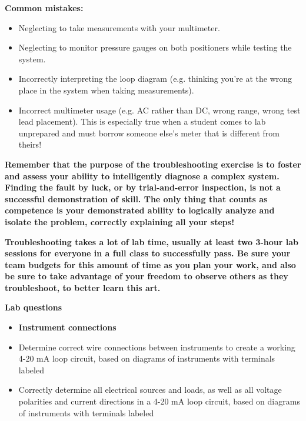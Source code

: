 \vskip 10pt

{\bf Common mistakes:}

\begin{itemize}
\item{} Neglecting to take measurements with your multimeter.
\item{} Neglecting to monitor pressure gauges on both positioners while testing the system.
\item{} Incorrectly interpreting the loop diagram (e.g. thinking you're at the wrong place in the system when taking measurements).
\item{} Incorrect multimeter usage (e.g. AC rather than DC, wrong range, wrong test lead placement).  This is especially true when a student comes to lab unprepared and must borrow someone else's meter that is different from theirs!
\end{itemize}

\vskip 10pt

{\bf Remember that the purpose of the troubleshooting exercise is to foster and assess your ability to intelligently diagnose a complex system.  Finding the fault by luck, or by trial-and-error inspection, is not a successful demonstration of skill.  The only thing that counts as competence is your demonstrated ability to logically analyze and isolate the problem, correctly explaining all your steps!}

\vskip 10pt

{\bf Troubleshooting takes a lot of lab time, usually at least two 3-hour lab sessions for everyone in a full class to successfully pass.  Be sure your team budgets for this amount of time as you plan your work, and also be sure to take advantage of your freedom to observe others as they troubleshoot, to better learn this art.}



\vfil \eject

\noindent
{\bf Lab questions}

\vskip 5pt

\begin{itemize}
\item{} {\bf Instrument connections}
\item{} Determine correct wire connections between instruments to create a working 4-20 mA loop circuit, based on diagrams of instruments with terminals labeled
\item{} Correctly determine all electrical sources and loads, as well as all voltage polarities and current directions in a 4-20 mA loop circuit, based on diagrams of instruments with terminals labeled
\end{itemize}

